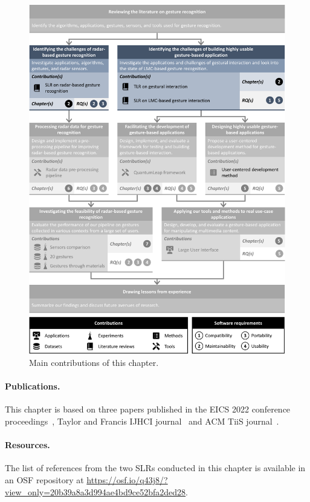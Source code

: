 \begin{figure}
    \centering
    \includegraphics[width=\linewidth]{Figures/StateOfTheArt/graphical-summary-state-of-the-art.pdf}
    \vspace{-18pt}
    \caption{Main contributions of this chapter.}
    \label{fig:state_of_the_art:graphical-summary}
\end{figure}

\paragraph{Publications.} This chapter is based on three papers published in the EICS 2022 conference proceedings~\cite{Sluyters:2022:EICS}, Taylor and Francis IJHCI journal~\cite{Sluyters:2022:LUI} and ACM TiiS journal~\cite{Sluyters:2023}.

\paragraph{Resources.} The list of references from the two SLRs conducted in this chapter is available in an OSF repository at \url{https://osf.io/q43j8/?view_only=20b39a8a3d994ae4bd9ce52bfa2ded28}.



